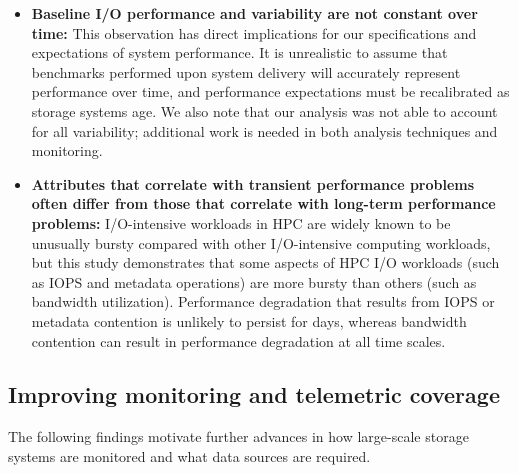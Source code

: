 \begin{itemize}[leftmargin=*]

\item \textbf{Baseline I/O performance and variability are not constant over
time:}
This observation has direct implications for our specifications and expectations of system performance.
It is unrealistic to assume that benchmarks performed upon system delivery
will accurately represent performance over time, and performance
expectations must be recalibrated as storage systems age.  We also note that
our analysis was not able to account for all variability; additional work is
needed in both analysis techniques and monitoring.

\item \textbf{Attributes that correlate with transient performance problems often differ from those that correlate with long-term performance problems:}
I/O-intensive workloads in HPC are widely known to be unusually bursty compared with other I/O-intensive computing workloads, but this study demonstrates that some aspects of HPC I/O workloads (such as IOPS and metadata operations) are more bursty than others (such as bandwidth utilization).
Performance degradation that results from IOPS or metadata contention is unlikely to persist for days, whereas bandwidth contention can result in performance degradation at all time scales.

\end{itemize}


\subsection{Improving monitoring and telemetric coverage}

The following findings motivate further advances in how large-scale storage systems are monitored and what data sources are required.


